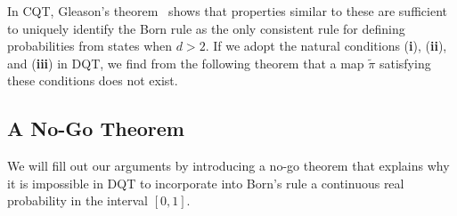 \documentclass[english,12pt]{iopart}
\newcommand{\dpt}{{\tilde{\pi}}}
\begin{document}
In CQT, Gleason's theorem~\cite{gleason1957} shows that properties
similar to these are sufficient to uniquely identify the Born rule as
the only consistent rule for defining probabilities from states when
$d>2$.  If we adopt the natural conditions ({\bf i}), ({\bf ii}), and
({\bf iii}) in DQT, we find from the following theorem that a map
$\dpt$ satisfying these conditions does not exist.

\subsection{A No-Go Theorem}

We will fill out our arguments by introducing a no-go theorem that
explains why it is impossible in DQT to incorporate into Born's rule a
continuous real probability in the interval $[0,1]$.
\end{document}
